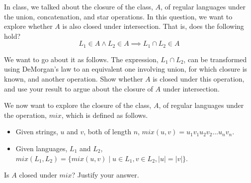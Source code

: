 \documentclass[addpoints]{exam}
\begin{document}
\begin{questions}

\question[5] In class, we talked about the closure of the class, $A$, of regular languages under the union, concatenation, and star operations. In this question, we want to explore whether $A$ is also closed under intersection. That is, does the following hold?
  \[
    L_1\in A \land L_2\in A \implies L_1 \cap L_2\in A
  \]

  We want to go about it as follows. The expression, $L_1 \cap L_2$, can be transformed using DeMorgan's law to an equivalent one involving union, for which closure is known, and another operation. Show whether $A$ is closed under this operation, and use your result to argue about the closure of $A$ under intersection.

\question[5] We now want to explore the closure of the class, $A$, of regular languages under the operation, $mix$, which is defined as follows.
  \begin{itemize}
  \item Given strings, $u$ and $v$, both of length $n$, $mix(u,v) = u_1v_1u_2v_2\ldots u_nv_n$.
  \item Given languages, $L_1$ and $L_2$, $mix(L_1,L_2) = \{mix(u,v) \mid u\in L_1, v\in L_2, |u| = |v|\}$.
  \end{itemize}
  Is $A$ closed under $mix$? Justify your answer.
  
\end{questions}
\end{document}
